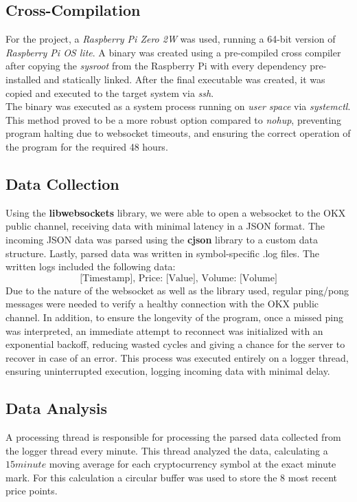 \documentclass[12pt]{article}
\begin{document}
    \subsection{Cross-Compilation}
        For the project, a \textit{Raspberry Pi Zero 2W} was used, running a 64-bit version of \textit{Raspberry Pi OS lite}. 
        A binary was created using a pre-compiled cross compiler after copying the \textit{sysroot} from the Raspberry Pi with 
        every dependency pre-installed and statically linked. After the final executable was created, it was copied and executed 
        to the target system via \textit{ssh}. \\

        The binary was executed as a system process running on \textit{user space} via \textit{systemctl}. 
        This method proved to be a more robust option compared to \textit{nohup}, preventing program halting due to websocket 
        timeouts, and ensuring the correct operation of the program for the required 48 hours.

    \subsection{Data Collection}
        Using the \textbf{libwebsockets} library, we were able to open a websocket to the OKX public channel, 
        receiving data with minimal latency in a JSON format. The incoming JSON data was parsed using the \textbf{cjson} 
        library to a custom data structure. Lastly, parsed data was written in symbol-specific .log files. The written logs included the following data: 
        \[
            \text{[Timestamp], Price: [Value], Volume: [Volume]}
        \]
        Due to the nature of the websocket as well as the library used, regular ping/pong messages were needed to verify a healthy 
        connection with the OKX public channel. In addition, to ensure the longevity of the program, once a missed ping was interpreted, 
        an immediate attempt to reconnect was initialized with an exponential backoff, reducing wasted cycles and giving a chance for 
        the server to recover in case of an error. This process was executed entirely on a logger thread, ensuring uninterrupted execution, 
        logging incoming data with minimal delay.
        
    \subsection{Data Analysis}
        A processing thread is responsible for processing the parsed data collected from the logger thread every minute. This thread analyzed 
        the data, calculating a $15 minute$ moving average for each cryptocurrency symbol at the exact minute mark. For this calculation 
        a circular buffer was used to store the 8 most recent price points. \\
\end{document}

